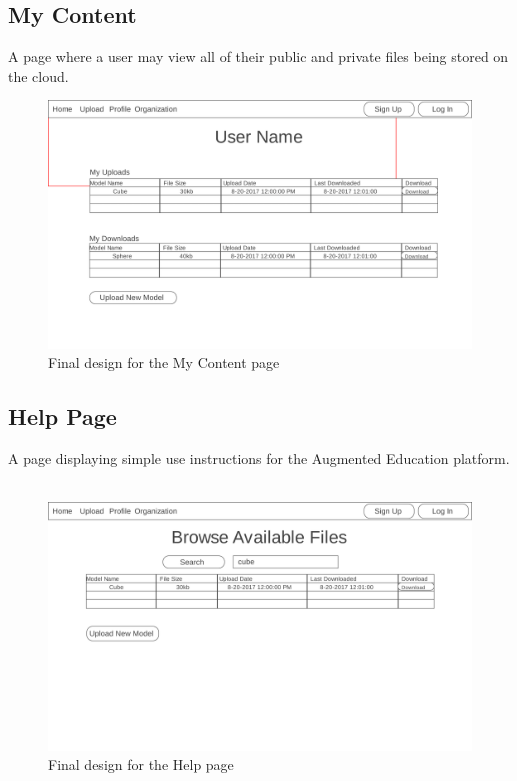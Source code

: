 \subsection{My Content}
    \hspace{7mm}
    A page where a user may view all of their public and private files being stored 
    on the cloud.
    \ \\
    \label{fig:final_my_content_page}
    \begin{figure}[H]
        \centering \includegraphics[width=0.6\linewidth]{UserPage}
        \caption{Final design for the My Content page}
    \end{figure}

\subsection{Help Page}
    \hspace{7mm}
    A page displaying simple use instructions for the Augmented Education platform. 
    \ \\
    \label{fig:final_help_page}
    \begin{figure}[H]
        \centering \includegraphics[width=0.6\linewidth]{All}
        \caption{Final design for the Help page}
    \end{figure}
